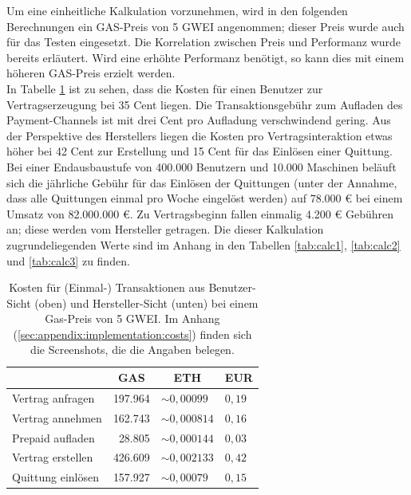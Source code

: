 Um eine einheitliche Kalkulation vorzunehmen, wird in den folgenden Berechnungen ein GAS-Preis von 5 GWEI angenommen; dieser Preis wurde auch für das Testen eingesetzt. Die Korrelation zwischen Preis und Performanz wurde bereits erläutert. Wird eine erhöhte Performanz benötigt, so kann dies mit einem höheren GAS-Preis erzielt werden.\\
In Tabelle \ref{tab:costs} ist zu sehen, dass die Kosten für einen Benutzer zur Vertragserzeugung bei 35 Cent liegen. Die Transaktionsgebühr zum Aufladen des Payment-Channels ist mit drei Cent pro Aufladung verschwindend gering. Aus der Perspektive des Herstellers liegen die Kosten pro Vertragsinteraktion etwas höher bei 42 Cent zur Erstellung und 15 Cent für das Einlösen einer Quittung. Bei einer Endausbaustufe von 400.000 Benutzern und 10.000 Maschinen beläuft sich die jährliche Gebühr für das Einlösen der Quittungen (unter der Annahme, dass alle Quittungen einmal pro Woche eingelöst werden) auf 78.000 € bei einem Umsatz von 82.000.000 €. Zu Vertragsbeginn fallen einmalig 4.200 € Gebühren an; diese werden vom Hersteller getragen. Die dieser Kalkulation zugrundeliegenden Werte sind im Anhang in den Tabellen \ref{tab:calc1}, \ref{tab:calc2} und \ref{tab:calc3} zu finden.\\

\begin{table}[h]
\caption{Kosten für (Einmal-) Transaktionen aus Benutzer-Sicht (oben) und Hersteller-Sicht (unten) bei einem Gas-Preis von 5 GWEI. Im Anhang (\ref{sec:appendix:implementation:costs}) finden sich die Screenshots, die die Angaben belegen.}
\label{tab:costs}
\centering
\begin{tabular}{@{}lrll@{}}
\toprule
\multicolumn{1}{c}{\textbf{}} & \multicolumn{1}{c}{\textbf{GAS}} & \multicolumn{1}{c}{\textbf{ETH}} & \multicolumn{1}{c}{\textbf{EUR}} \\ \midrule
Vertrag anfragen & 197.964 & $\sim 0,00099$ & $0,19$ \\
Vertrag annehmen & 162.743 & $\sim 0,000814$ & $0,16$ \\
Prepaid aufladen & 28.805 & $\sim 0,000144$ & $0,03$ \\ \bottomrule
Vertrag erstellen & 426.609 & $\sim 0,002133$ & $0,42$  \\
Quittung einlösen & 157.927 & $\sim 0,00079$ & $0,15$ \\ \bottomrule
\end{tabular}
\end{table}

